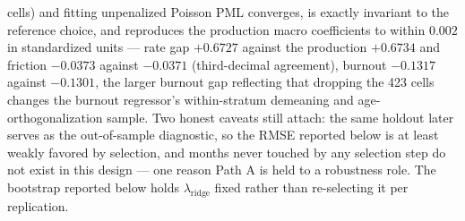 \documentclass[12pt]{article}
\begin{document}
cells) and fitting unpenalized Poisson PML converges, is exactly invariant to the reference choice, and reproduces the production macro coefficients to within $0.002$ in standardized units --- rate gap $+0.6727$ against the production $+0.6734$ and friction $-0.0373$ against $-0.0371$ (third-decimal agreement), burnout $-0.1317$ against $-0.1301$, the larger burnout gap reflecting that dropping the 423 cells changes the burnout regressor's within-stratum demeaning and age-orthogonalization sample. Two honest caveats still attach: the same holdout later serves as the out-of-sample diagnostic, so the RMSE reported below is at least weakly favored by selection, and months never touched by any selection step do not exist in this design --- one reason Path A is held to a robustness role. The bootstrap reported below holds $\lambda_{\mathrm{ridge}}$ fixed rather than re-selecting it per replication.
\end{document}
